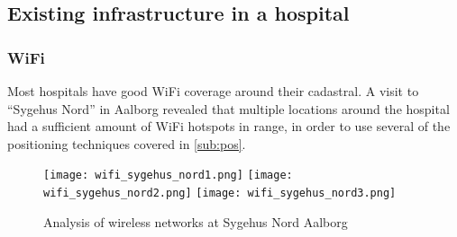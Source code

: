 \subsection{Existing infrastructure in a hospital} \label{sub:infra}

\subsubsection{WiFi}

Most hospitals have good WiFi coverage around their cadastral. A visit to \enquote{Sygehus Nord} in Aalborg revealed that multiple locations around the hospital had a sufficient amount of WiFi hotspots in range, in order to use several of the positioning techniques covered in \cref{sub:pos}.

\begin{figure}[htb]
	\begin{center} 
		{\texttt{[image: wifi\_sygehus\_nord1.png]}}
		\quad
		{\texttt{[image: wifi\_sygehus\_nord2.png]}}
		\quad
		{\texttt{[image: wifi\_sygehus\_nord3.png]}}
	\end{center}
	\caption{Analysis of wireless networks at Sygehus Nord Aalborg}
\end{figure}